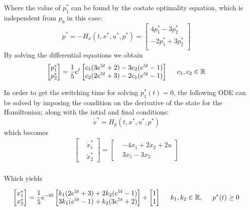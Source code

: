 Where the value of $p_1^*$ can be found by the costate optimality equation, which is independent from $p_0$ in this case: 
\begin{equation}
    \Dot{p}^* = - H_x(t, x^*, u^*, p^*) = 
    \begin{bmatrix}
    4p_1^* -3p_2^* \\
    -2p_1^* +  3p_2^*\\ 
\end{bmatrix}
\end{equation}
By solving the differential equations we obtain
\begin{equation}
    \begin{bmatrix}
    p_1^*\\
    p_2^*
    \end{bmatrix}
    = \frac{1}{5} e^t
    \begin{bmatrix}
    c_1  (3 e^{5 t} + 2) - 3 c_2 (e^{5 t} - 1) \\
    c_2 (2 e^{5 t} + 3) - 2 c_1 (e^{5 t} - 1) \\
    \end{bmatrix}
    \hspace{0.5cm} c_1, c_2 \in \mathbb{R}
\end{equation}

In order to get the switching time for solving $p_1^*(t) = 0$, the following ODE can be solved by imposing the condition on the derivative of the state for the Hamiltonian; along with the intial and final conditions:
\begin{equation}
    \Dot{x}^* = H_p(t, x^*, u^*, p^*)
\end{equation}
which becomes
\begin{align}
    \begin{bmatrix}
        &\Dot{x}^*_1\\
        &\Dot{x}^*_2
    \end{bmatrix}
    =
    \begin{bmatrix}
        &-4x_1 +2x_2 +2u\\
        &3x_1 - 3x_2
    \end{bmatrix}\\
\end{align}

Which yields

\begin{equation}
\begin{bmatrix}
    x_1^*\\
    x_2^*
    \end{bmatrix}
    = \frac{1}{5} e^{-6t} 
    \begin{bmatrix}
    k_1  (2 e^{5 t} + 3) + 2 k_2 (e^{5 t} - 1) \\
    3k_1 ( e^{5 t} - 1) +  k_2 (3e^{5 t} + 2) \\
    \end{bmatrix}
    +
    \begin{bmatrix}
    1\\
    1\\
    \end{bmatrix}
    \hspace{0.5cm} k_1, k_2 \in \mathbb{R}, \hspace{0.5cm} p^*(t) \geq 0
\end{equation}

